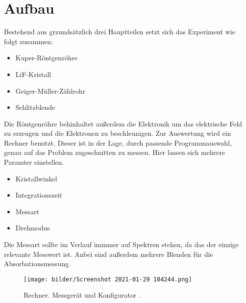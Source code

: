 \section{Aufbau}
Bestehend aus grzundsätzlich drei Hauptteilen setzt sich das Experiment wie folgt zusammen:
\begin{itemize}
    \item{Kuper-Röntgenröhre}
     \item{LiF-Kristall}
     \item{Geiger-Müller-Zählrohr}
     \item{Schlitzblende}
\end{itemize}
Die Röntgenröhre behinhaltet außerdem die Elektronik um das elektrische Feld zu erzeugen und die Elektronen zu beschleunigen.
Zur Auswertung wird ein Rechner benutzt. Dieser ist in der Lage, durch passende Programmauswahl, genau auf das Problem zugeschnitten zu messen. 
Hier lassen sich mehrere Paramter einstellen. 
\begin{itemize}
     \item{Kristallwinkel}
     \item{Integrationszeit}
     \item{Messart}
     \item{Drehmodus}
\end{itemize}
Die Messart sollte im Verlauf immmer auf Spektren stehen, da das der einzige relevante Messwert ist. Anbei sind außerdem mehrere Blenden für die Absorbationsmessung.

\begin{figure}
    \centering
    \texttt{[image: bilder/Screenshot 2021-01-29 104244.png]}
    \caption{Rechner. Messgerät und Konfigurator \cite{skript}. } 
    \label{fig:Rechner}
\end{figure}